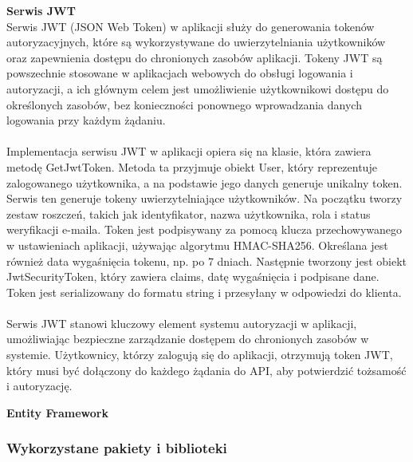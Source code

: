 \documentclass[12pt,a4paper]{article}
\begin{document}
\noindent \textbf{Serwis JWT}\\
Serwis JWT (JSON Web Token) w aplikacji służy do generowania tokenów autoryzacyjnych, które są wykorzystywane do uwierzytelniania użytkowników oraz zapewnienia dostępu do chronionych zasobów aplikacji. Tokeny JWT są powszechnie stosowane w aplikacjach webowych do obsługi logowania i autoryzacji, a ich głównym celem jest umożliwienie użytkownikowi dostępu do określonych zasobów, bez konieczności ponownego wprowadzania danych logowania przy każdym żądaniu.
\\\\
Implementacja serwisu JWT w aplikacji opiera się na klasie, która zawiera metodę GetJwtToken. Metoda ta przyjmuje obiekt User, który reprezentuje zalogowanego użytkownika, a na podstawie jego danych generuje unikalny token. Serwis ten generuje tokeny uwierzytelniające użytkowników. Na początku tworzy zestaw roszczeń, takich jak identyfikator, nazwa użytkownika, rola i status weryfikacji e-maila. Token jest podpisywany za pomocą klucza przechowywanego w ustawieniach aplikacji, używając algorytmu HMAC-SHA256. Określana jest również data wygaśnięcia tokenu, np. po 7 dniach. Następnie tworzony jest obiekt JwtSecurityToken, który zawiera claims, datę wygaśnięcia i podpisane dane. Token jest serializowany do formatu string i przesyłany w odpowiedzi do klienta.
\\\\
Serwis JWT stanowi kluczowy element systemu autoryzacji w aplikacji, umożliwiając bezpieczne zarządzanie dostępem do chronionych zasobów w systemie. Użytkownicy, którzy zalogują się do aplikacji, otrzymują token JWT, który musi być dołączony do każdego żądania do API, aby potwierdzić tożsamość i autoryzację.

\newpage

\noindent \textbf{Entity Framework}\\

\newpage
\subsubsection{Wykorzystane pakiety i biblioteki}
\end{document}
